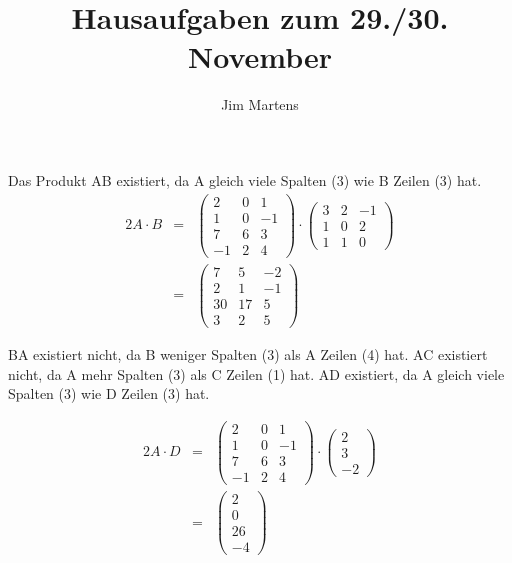 \documentclass[10pt,a4paper,oneside,ngerman,numbers=noenddot]{scrartcl}
\begin{document}
\author{Jim Martens}
\title{Hausaufgaben zum 29./30. November}
\maketitle
\section{} %
\subsection{} %
Das Produkt AB existiert, da A gleich viele Spalten (3) wie B Zeilen (3) hat.
\begin{alignat*}{2}
A \cdot B &=& \begin{pmatrix} 2 & 0 & 1 \\ 1 & 0 & -1 \\ 7 & 6 & 3 \\ -1 & 2 & 4 \end{pmatrix} \cdot \begin{pmatrix} 3 & 2 & -1 \\ 1 & 0 & 2 \\ 1 & 1 & 0 \end{pmatrix} \\
&=& \begin{pmatrix} 7 & 5 & -2 \\ 2 & 1 & -1 \\ 30 & 17 & 5 \\ 3 & 2 & 5 \end{pmatrix}
\end{alignat*}

BA existiert nicht, da B weniger Spalten (3) als A Zeilen (4) hat.
AC existiert nicht, da A mehr Spalten (3) als C Zeilen (1) hat.
AD existiert, da A gleich viele Spalten (3) wie D Zeilen (3) hat.

\begin{alignat*}{2}
A \cdot D &=& \begin{pmatrix} 2 & 0 & 1 \\ 1 & 0 & -1 \\ 7 & 6 & 3 \\ -1 & 2 & 4 \end{pmatrix} \cdot \begin{pmatrix} 2 \\ 3 \\ -2 \end{pmatrix} \\
&=& \begin{pmatrix} 2 \\ 0 \\ 26 \\ -4 \end{pmatrix}
\end{alignat*}
\end{document}
